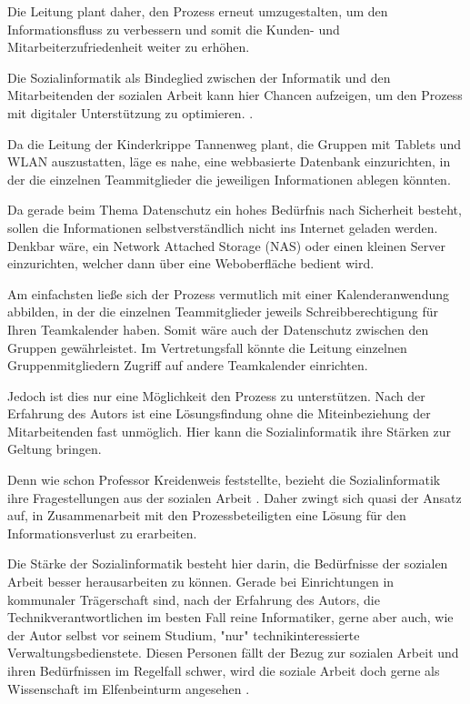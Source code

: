 Die Leitung plant daher, den Prozess erneut umzugestalten, um den Informationsfluss zu verbessern und somit die Kunden- und Mitarbeiterzufriedenheit weiter zu erhöhen.

Die Sozialinformatik als Bindeglied zwischen der Informatik und den Mitarbeitenden der sozialen Arbeit kann hier Chancen aufzeigen, um den Prozess mit digitaler Unterstützung zu optimieren. \citep[][90]{kreidenweis2012}.

Da die Leitung der Kinderkrippe Tannenweg plant, die Gruppen mit Tablets und WLAN auszustatten, läge es nahe, eine webbasierte Datenbank einzurichten, in der die einzelnen Teammitglieder die jeweiligen Informationen ablegen könnten. 

Da gerade beim Thema Datenschutz ein hohes Bedürfnis nach Sicherheit besteht, sollen die Informationen selbstverständlich nicht ins Internet geladen werden. Denkbar wäre, ein Network Attached Storage (NAS) oder einen kleinen Server einzurichten, welcher dann über eine Weboberfläche bedient wird.

Am einfachsten ließe sich der Prozess vermutlich mit einer Kalenderanwendung abbilden, in der die einzelnen Teammitglieder jeweils Schreibberechtigung für Ihren Teamkalender haben. Somit wäre auch der Datenschutz zwischen den Gruppen gewährleistet. Im Vertretungsfall könnte die Leitung einzelnen Gruppenmitgliedern Zugriff auf andere Teamkalender einrichten.

Jedoch ist dies nur eine Möglichkeit den Prozess zu unterstützen. Nach der Erfahrung des Autors ist eine Lösungsfindung ohne die Miteinbeziehung der Mitarbeitenden fast unmöglich. Hier kann die Sozialinformatik ihre Stärken zur Geltung bringen.

Denn wie schon Professor Kreidenweis feststellte, bezieht die Sozialinformatik ihre Fragestellungen aus der sozialen Arbeit \citep[vgl.][26]{kreidenweis2012}.
Daher zwingt sich quasi der Ansatz auf, in Zusammenarbeit mit den Prozessbeteiligten eine Lösung für den Informationsverlust zu erarbeiten.

Die Stärke der Sozialinformatik besteht hier darin, die Bedürfnisse der sozialen Arbeit besser herausarbeiten zu können. Gerade bei Einrichtungen in kommunaler Trägerschaft sind, nach der Erfahrung des Autors, die Technikverantwortlichen im besten Fall reine Informatiker, gerne aber auch, wie der Autor selbst vor seinem Studium, "{}nur"{} technikinteressierte Verwaltungsbedienstete.
Diesen Personen fällt der Bezug zur sozialen Arbeit und ihren Bedürfnissen im Regelfall schwer, wird die soziale Arbeit doch gerne als Wissenschaft im Elfenbeinturm angesehen \citep[vgl.][9]{kromrey2009}.


